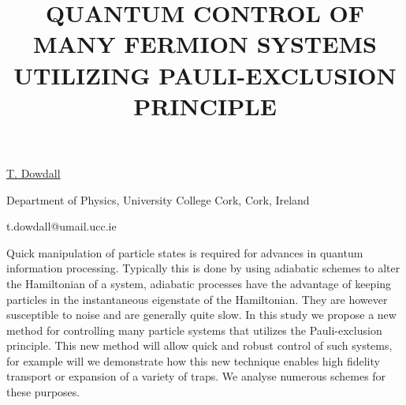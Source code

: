 \title{QUANTUM CONTROL OF MANY FERMION SYSTEMS UTILIZING PAULI-EXCLUSION PRINCIPLE}

\underline{T. Dowdall} 

{\normalsize{\vspace{-4mm}
Department of Physics,
University College Cork,
Cork, Ireland

\email t.dowdall@umail.ucc.ie}}

Quick manipulation of particle states is required for advances in quantum information processing.
Typically this is done by using adiabatic schemes to alter the Hamiltonian of a system, adiabatic processes have the advantage of keeping particles in the instantaneous eigenstate of the Hamiltonian.  They are however susceptible to noise and are generally quite slow. In this study we propose a new method for controlling many particle systems that utilizes the Pauli-exclusion principle. This new method will allow quick and robust control of such systems, for example will we demonstrate how this new technique enables high fidelity transport or expansion of a variety of traps. We analyse numerous schemes for these purposes.


\vspace{\baselineskip} 